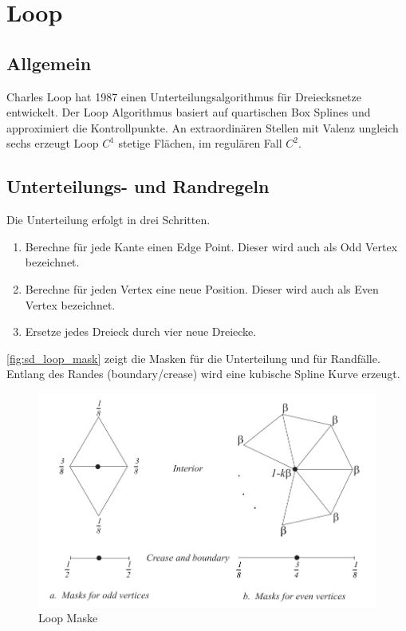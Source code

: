 \section{Loop} \label{sec:loop}

\subsection{Allgemein}

Charles Loop hat 1987 einen Unterteilungsalgorithmus für Dreiecksnetze entwickelt.
Der Loop Algorithmus basiert auf quartischen Box Splines und approximiert die Kontrollpunkte.
An extraordinären Stellen mit Valenz ungleich sechs erzeugt Loop \(C^1\) stetige Flächen,
im regulären Fall \(C^2\).
\cite[S. 70f]{Zorin.subdivcourse} \cite[S. 56f]{Standford.24.07.2015}

\subsection{Unterteilungs- und Randregeln}

Die Unterteilung erfolgt in drei Schritten.
\begin{enumerate}
\item Berechne für jede Kante einen Edge Point. Dieser wird auch als Odd Vertex bezeichnet.
\item Berechne für jeden Vertex eine neue Position. Dieser wird auch als Even Vertex bezeichnet.
\item Ersetze jedes Dreieck durch vier neue Dreiecke.
\end{enumerate}

\autoref{fig:sd_loop_mask} zeigt die Masken für die Unterteilung
und für Randfälle.
Entlang des Randes (boundary/crease) wird eine kubische Spline Kurve erzeugt.
\cite[S. 70]{Zorin.subdivcourse}
\begin{figure}
\centering
\includegraphics[width=1.0\textwidth]{content/media/sd_loop_mask.jpg}
\caption{Loop Maske \cite[S. 70f]{Zorin.subdivcourse}}
\label{fig:sd_loop_mask}
\end{figure}

